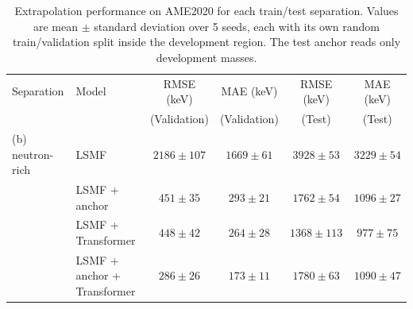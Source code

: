 \begin{table}[htbp]\centering
\caption{Extrapolation performance on AME2020 for each train/test separation. Values are mean $\pm$ standard deviation over 5 seeds, each with its own random train/validation split inside the development region. The test anchor reads only development masses.}
\label{tab:extrapolation}
\begin{tabular}{llcccc}\hline\hline
Separation & Model & RMSE (keV) & MAE (keV) & RMSE (keV) & MAE (keV) \\
 & & (Validation) & (Validation) & (Test) & (Test) \\ \hline
(b) neutron-rich & LSMF & $2186 \pm 107$ & $1669 \pm 61$ & $3928 \pm 53$ & $3229 \pm 54$ \\
 & LSMF + anchor & $451 \pm 35$ & $293 \pm 21$ & $1762 \pm 54$ & $1096 \pm 27$ \\
 & LSMF + Transformer & $448 \pm 42$ & $264 \pm 28$ & $1368 \pm 113$ & $977 \pm 75$ \\
 & LSMF + anchor + Transformer & $286 \pm 26$ & $173 \pm 11$ & $1780 \pm 63$ & $1090 \pm 47$ \\
\hline
\hline\end{tabular}\end{table}
